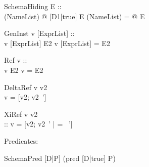 \begin{zedrule}{SchemaHiding}
  E ::\power [D1| true] \\
  [D1|true]\hide (NameList) \is \exists [D2|true] @ [D1|true]
\derives
  E \hide (NameList) = \exists [D2|true] @ E
\end{zedrule}


\begin{zedrule}{GenInst}
  v [ExprList] :: \power [D | true] \\
  v [ExprList] \hasDefn E2
\derives
  v [ExprList] = E2
\end{zedrule}

\begin{zedrule}{Ref}
  v :: \power [D | true] \\
  v \hasDefn E2
\derives
  v = E2
\end{zedrule}

\begin{zedrule}{DeltaRef}
  \Delta \unprefix v \is v2 \\
\derives
  v = [v2; v2~']
\end{zedrule}

\begin{zedrule}{XiRef}
  \Xi \unprefix v \is v2 \\
  [v2|true] :: \power [D2 | true] 
\derives
  v = [v2; v2~' | \theta [D2|true] = \theta [D2|true]~']
\end{zedrule}


Predicates:

\begin{zedrule}{SchemaPred}
  [D|P] \iff (pred [D|true] \land P)
\end{zedrule}
